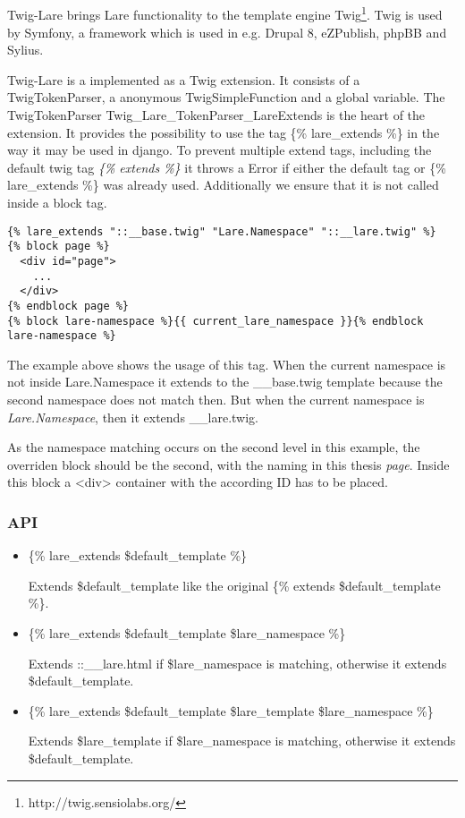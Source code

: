\subsection{\twigLare{}}
Twig-Lare brings Lare functionality to the template engine Twig\footnote{http://twig.sensiolabs.org/}.
Twig is used by Symfony, a framework which is used in e.g. Drupal 8, eZPublish, phpBB and Sylius.

Twig-Lare is a implemented as a Twig extension.
It consists of a TwigTokenParser, a anonymous TwigSimpleFunction and a global variable.
The TwigTokenParser Twig\_Lare\_TokenParser\_LareExtends is the heart of the extension.
It provides the possibility to use the tag \{\% lare\_extends \%\} in the way it may be used in django.
To prevent multiple extend tags, including the default twig tag \emph{\{\% extends \%\}} it throws a Error if either the default tag or \{\% lare\_extends \%\} was already used.
Additionally we ensure that it is not called inside a block tag.

\begin{minipage}[c]{0.95\linewidth}
\begin{lstlisting}
{% lare_extends "::__base.twig" "Lare.Namespace" "::__lare.twig" %}
{% block page %}
  <div id="page">
    ...
  </div>
{% endblock page %}
{% block lare-namespace %}{{ current_lare_namespace }}{% endblock lare-namespace %}
\end{lstlisting}
\end{minipage}

The example above shows the usage of this tag.
When the current namespace is not inside Lare.Namespace it extends to the \:\:\_\_base.twig template because the second namespace does not match then.
But when the current namespace is \emph{Lare.Namespace}, then it extends \:\:\_\_lare.twig.

As the namespace matching occurs on the second level in this example, the overriden block should be the second, with the naming in this thesis \emph{page}.
Inside this block a <div> container with the according ID has to be placed.

\subsubsection{API}

\begin{itemize}
\item \{\% lare\_extends \$default\_template \%\}

Extends \$default\_template like the original \{\% extends \$default\_template \%\}.
\item \{\% lare\_extends \$default\_template \$lare\_namespace \%\}

Extends ::\_\_lare.html if \$lare\_namespace is matching, otherwise it extends \$default\_template.
\item \{\% lare\_extends \$default\_template \$lare\_template \$lare\_namespace \%\}

Extends \$lare\_template if \$lare\_namespace is matching, otherwise it extends \$default\_template.
\end{itemize}


